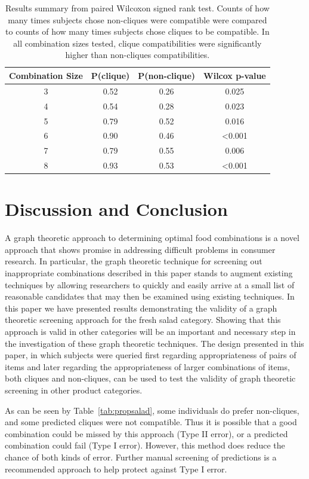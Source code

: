 \begin{table}[h!b!p!]
\caption[Wilcoxon Test Results]{Results summary from paired Wilcoxon signed rank test.  Counts of how many times subjects chose non-cliques were compatible were compared to counts of how many times subjects chose cliques to be compatible.  In all combination sizes tested, clique compatibilities were significantly higher than non-cliques compatibilities.}
\centering
\begin{tabular}{cccc}
\toprule
{\bf Combination Size} & {\bf P(clique)} & {\bf P(non-clique)} & {\bf Wilcox p-value} \\
\midrule
3 & 0.52 & 0.26 & 0.025 \\
4 & 0.54 & 0.28 & 0.023 \\
5 & 0.79 & 0.52 & 0.016 \\
6 & 0.90 & 0.46 & \textless 0.001 \\
7 & 0.79 & 0.55 & 0.006 \\
8 & 0.93 & 0.53 & \textless 0.001 \\
\bottomrule
\end{tabular}
\label{tab:wilcoxsalad}
\end{table}

\section{Discussion and Conclusion}
A graph theoretic approach to determining optimal food combinations is a novel approach that shows promise in addressing difficult problems in consumer research.  In particular, the graph theoretic technique for screening out inappropriate combinations described in this paper stands to augment existing techniques by allowing researchers to quickly and easily arrive at a small list of reasonable candidates that may then be examined using existing techniques.  In this paper we have presented results demonstrating the validity of a graph theoretic screening approach for the fresh salad category.  Showing that this approach is valid in other categories will be an important and necessary step in the investigation of these graph theoretic techniques.  The design presented in this paper, in which subjects were queried first regarding appropriateness of pairs of items and later regarding the appropriateness of larger combinations of items, both cliques and non-cliques, can be used to test the validity of graph theoretic screening in other product categories.  

As can be seen by Table~\ref{tab:propsalad}, some individuals do prefer non-cliques, and some predicted cliques were not compatible.   Thus it is possible that a good combination could be missed by this approach (Type II error), or a predicted combination could fail (Type I error).  However, this method does reduce the chance of both kinds of error.  Further manual screening of predictions is a recommended approach to help protect against Type I error.    

